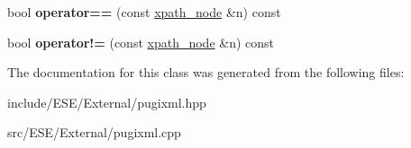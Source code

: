 \begin{DoxyCompactItemize}
\item 
\hypertarget{classpugi_1_1xpath__node_ac41341c30e66880aad2a731203d9cf4b}{bool {\bfseries operator==} (const \hyperlink{classpugi_1_1xpath__node}{xpath\-\_\-node} \&n) const }\label{classpugi_1_1xpath__node_ac41341c30e66880aad2a731203d9cf4b}

\item 
\hypertarget{classpugi_1_1xpath__node_a785725ca60a15a9d2df83b91725105bd}{bool {\bfseries operator!=} (const \hyperlink{classpugi_1_1xpath__node}{xpath\-\_\-node} \&n) const }\label{classpugi_1_1xpath__node_a785725ca60a15a9d2df83b91725105bd}

\end{DoxyCompactItemize}


The documentation for this class was generated from the following files\-:\begin{DoxyCompactItemize}
\item 
include/\-E\-S\-E/\-External/pugixml.\-hpp\item 
src/\-E\-S\-E/\-External/pugixml.\-cpp\end{DoxyCompactItemize}
